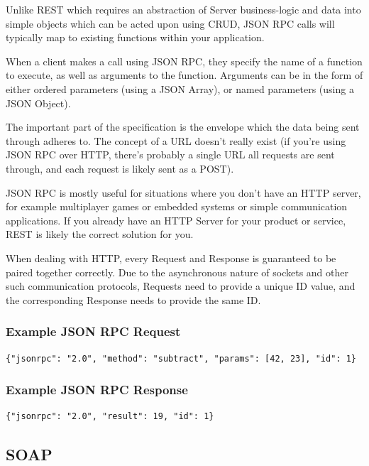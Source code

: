 \documentclass{book}
\begin{document}
Unlike REST which requires an abstraction of Server business-logic and data into simple objects which can be acted upon using CRUD, JSON RPC calls will typically map to existing functions within your application.

When a client makes a call using JSON RPC, they specify the name of a function to execute, as well as arguments to the function. Arguments can be in the form of either ordered parameters (using a JSON Array), or named parameters (using a JSON Object).

The important part of the specification is the envelope which the data being sent through adheres to. The concept of a URL doesn't really exist (if you're using JSON RPC over HTTP, there's probably a single URL all requests are sent through, and each request is likely sent as a POST).

JSON RPC is mostly useful for situations where you don't have an HTTP server, for example multiplayer games or embedded systems or simple communication applications. If you already have an HTTP Server for your product or service, REST is likely the correct solution for you.

When dealing with HTTP, every Request and Response is guaranteed to be paired together correctly. Due to the asynchronous nature of sockets and other such communication protocols, Requests need to provide a unique ID value, and the corresponding Response needs to provide the same ID.

\subsubsection{Example JSON RPC Request}

\begin{verbatim}
{"jsonrpc": "2.0", "method": "subtract", "params": [42, 23], "id": 1}
\end{verbatim}

\subsubsection{Example JSON RPC Response}

\begin{verbatim}
{"jsonrpc": "2.0", "result": 19, "id": 1}
\end{verbatim}


\subsection{SOAP}
\end{document}
